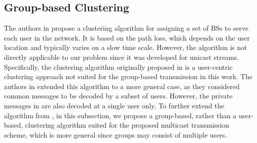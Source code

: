 \documentclass[12pt,draftcls,onecolumn]{IEEEtran}
\theoremstyle{remark}
\theoremstyle{definition}
\begin{document}
{\subsection{Group-based Clustering}
The authors in \cite{DaiY14} propose a clustering algorithm for assigning a set of BSs to serve each user in the network. It is based on the path loss, which depends on the user location and typically varies on a slow time scale. However, the algorithm is not directly applicable to our problem since it was developed for unicast streams. Specifically, the clustering algorithm originally proposed in \cite{DaiY14} is a user-centric clustering approach not suited for the group-based transmission in this work. The authors in \cite{9217249} extended this algorithm to a more general case, as they considered common messages to be decoded by a subset of users. However, the private messages in \cite{9217249} are also decoded at a single user only. To further extend the algorithm from \cite{9217249}, in this subsection, we propose a group-based, rather than a user-based, clustering algorithm suited for the proposed multicast transmission scheme, which is more general since groups may consist of multiple users. %

}
\end{document}
